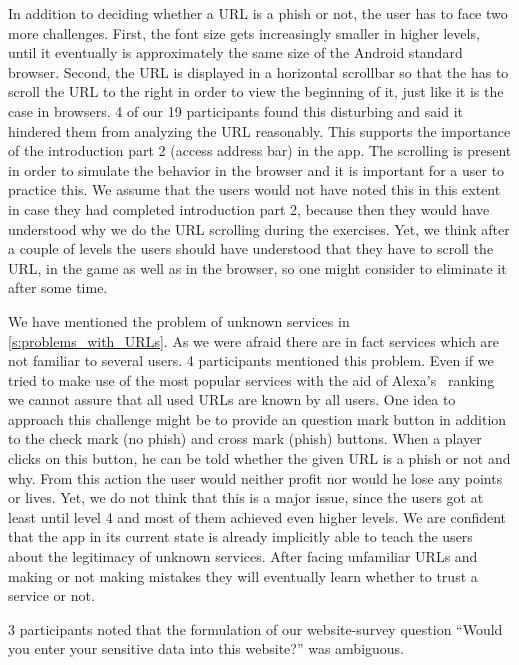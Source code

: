 \begin{description}[leftmargin=0cm]	
	\item[Scrolling of URL:] In addition to deciding whether a URL is a phish or not, the user has to face two more challenges. 
First, the font size gets increasingly smaller in higher levels, until it eventually is approximately the same size of the Android standard browser.
Second, the URL is displayed in a horizontal scrollbar so that the has to scroll the URL to the right in order to view the beginning of it, just like it is the case in browsers.
4 of our 19 participants found this disturbing and said it hindered them from analyzing the URL reasonably. 
This supports the importance of the introduction part 2 (access address bar) in the app.
The scrolling is present in order to simulate the behavior in the browser and it is important for a user to practice this.
We assume that the users would not have noted this in this extent in case they had completed introduction part 2, because then they would have understood why we do the URL scrolling during the exercises.
Yet, we think after a couple of levels the users should have understood that they have to scroll the URL, in the game as well as in the browser, so one might consider to eliminate it after some time. 
	\item[Unknown Services:] We have mentioned the problem of unknown services in \autoref{s:problems_with_URLs}.
As we were afraid there are in fact services which are not familiar to several users.
4 participants mentioned this problem.
Even if we tried to make use of the most popular services with the aid of Alexa's~\cite{alexa} ranking we cannot assure that all used URLs are known by all users.
One idea to approach this challenge might be to provide an question mark button in addition to the check mark (no phish) and cross mark (phish) buttons. 
When a player clicks on this button, he can be told whether the given URL is a phish or not and why.
From this action the user would neither profit nor would he lose any points or lives.
Yet, we do not think that this is a major issue, since the users got at least until level 4 and most of them achieved even higher levels.
We are confident that the app in its current state is already implicitly able to teach the users about the legitimacy of unknown services.
After facing unfamiliar URLs and making or not making mistakes they will eventually learn whether to trust a service or not.
	\item[Question to Data Entry:] 3 participants noted that the formulation of our website-survey question ``Would you enter your sensitive data into this website?'' was ambiguous.

\end{description}
